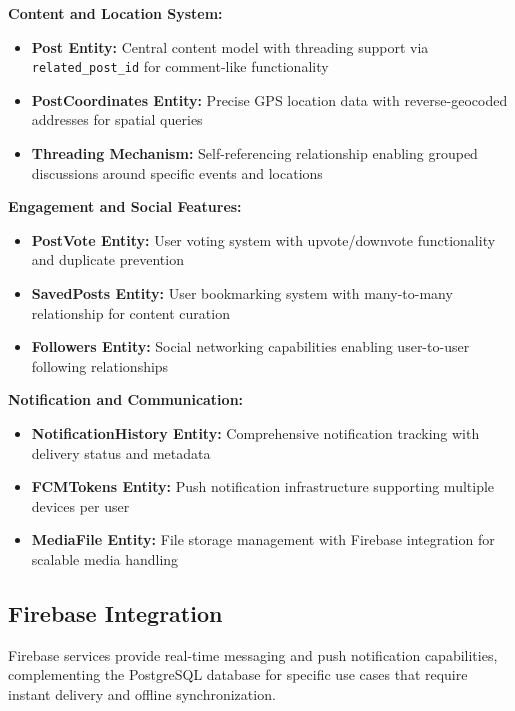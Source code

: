 \textbf{Content and Location System:}
\begin{itemize}
    \item \textbf{Post Entity:} Central content model with threading support via \texttt{related\_post\_id} for comment-like functionality
    \item \textbf{PostCoordinates Entity:} Precise GPS location data with reverse-geocoded addresses for spatial queries
    \item \textbf{Threading Mechanism:} Self-referencing relationship enabling grouped discussions around specific events and locations
\end{itemize}

\textbf{Engagement and Social Features:}
\begin{itemize}
    \item \textbf{PostVote Entity:} User voting system with upvote/downvote functionality and duplicate prevention
    \item \textbf{SavedPosts Entity:} User bookmarking system with many-to-many relationship for content curation
    \item \textbf{Followers Entity:} Social networking capabilities enabling user-to-user following relationships
\end{itemize}

\textbf{Notification and Communication:}
\begin{itemize}
    \item \textbf{NotificationHistory Entity:} Comprehensive notification tracking with delivery status and metadata
    \item \textbf{FCMTokens Entity:} Push notification infrastructure supporting multiple devices per user
    \item \textbf{MediaFile Entity:} File storage management with Firebase integration for scalable media handling
\end{itemize}

\subsection{Firebase Integration}

Firebase services provide real-time messaging and push notification capabilities, complementing the PostgreSQL database for specific use cases that require instant delivery and offline synchronization.

\clearpage
